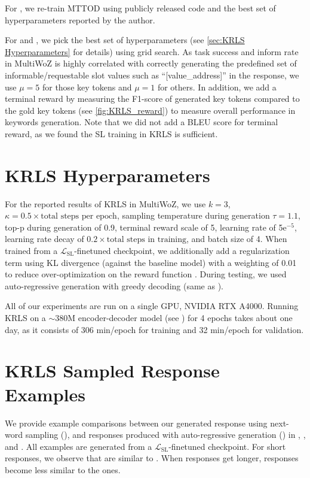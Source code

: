 For , we re-train MTTOD \cite{mttod} using publicly released code and the best set of hyperparameters reported by the author.

For  and , we pick the best set of hyperparameters (see \autoref{sec:KRLS Hyperparameters} for details) using grid search. As task success and inform rate in MultiWoZ is highly correlated with correctly generating the predefined set of informable/requestable slot values such as ``[value\_address]'' in the response, we use $\mu=5$ for those key tokens and $\mu=1$ for others. In addition, we add a terminal reward by measuring the F1-score of generated key tokens compared to the gold key tokens (see \autoref{fig:KRLS_reward}) to measure overall performance in keywords generation. 
Note that we did not add a BLEU score for terminal reward, as we found the SL training in KRLS is sufficient.

\section{KRLS Hyperparameters}
\label{sec:KRLS Hyperparameters}
For the reported results of KRLS in MultiWoZ, we use $k=3$, $\kappa=0.5\times \text{total steps per epoch}$, sampling temperature during generation $\tau=1.1$, top-p during generation of 0.9, terminal reward scale of 5, learning rate of 5e$^{-5}$, learning rate decay of $0.2\times \text{total steps in training}$, and batch size of 4. When trained from a $\mathcal{L}_{\mathrm{SL}}$-finetuned checkpoint, we additionally add a regularization term using KL divergence (against the baseline model) with a weighting of 0.01 to reduce over-optimization on the reward function \cite{instructGPT, rl4lm, offline-with-kl}. During testing, we used auto-regressive generation with greedy decoding (same as \citet{mttod}).

All of our experiments are run on a single GPU, NVIDIA RTX A4000. Running KRLS on a $\sim$380M encoder-decoder model (see ) for 4 epochs takes about one day, as it consists of 306 min/epoch for training and 32 min/epoch for validation.
\section{KRLS Sampled Response Examples}
\label{sec:KRLS Sampled Response Examples}
We provide example comparisons between our generated response using next-word sampling (), and responses produced with auto-regressive generation () in , , and . All examples are generated from a $\mathcal{L}_{\mathrm{SL}}$-finetuned checkpoint. For short responses, we observe that  are similar to . When responses get longer,  responses become less similar to the  ones.

